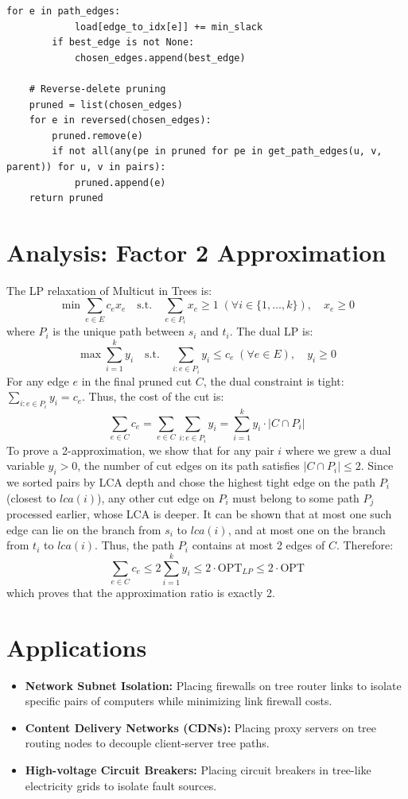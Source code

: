 \begin{lstlisting}[style=python, caption=Primal-Dual Multicut in Trees]
        for e in path_edges:
            load[edge_to_idx[e]] += min_slack
        if best_edge is not None:
            chosen_edges.append(best_edge)
            
    # Reverse-delete pruning
    pruned = list(chosen_edges)
    for e in reversed(chosen_edges):
        pruned.remove(e)
        if not all(any(pe in pruned for pe in get_path_edges(u, v, parent)) for u, v in pairs):
            pruned.append(e)
    return pruned
\end{lstlisting}

\section{Analysis: Factor 2 Approximation}
The LP relaxation of Multicut in Trees is:
\[
\min \sum_{e \in E} c_e x_e \quad \text{s.t.} \quad \sum_{e \in P_i} x_e \ge 1 \; (\forall i \in \{1, \dots, k\}), \quad x_e \ge 0
\]
where $P_i$ is the unique path between $s_i$ and $t_i$. The dual LP is:
\[
\max \sum_{i=1}^k y_i \quad \text{s.t.} \quad \sum_{i: e \in P_i} y_i \le c_e \; (\forall e \in E), \quad y_i \ge 0
\]
For any edge $e$ in the final pruned cut $C$, the dual constraint is tight: $\sum_{i: e \in P_i} y_i = c_e$. Thus, the cost of the cut is:
\[
\sum_{e \in C} c_e = \sum_{e \in C} \sum_{i: e \in P_i} y_i = \sum_{i=1}^k y_i \cdot |C \cap P_i|
\]
To prove a 2-approximation, we show that for any pair $i$ where we grew a dual variable $y_i > 0$, the number of cut edges on its path satisfies $|C \cap P_i| \le 2$.
Since we sorted pairs by LCA depth and chose the highest tight edge on the path $P_i$ (closest to $lca(i)$), any other cut edge on $P_i$ must belong to some path $P_j$ processed earlier, whose LCA is deeper. It can be shown that at most one such edge can lie on the branch from $s_i$ to $lca(i)$, and at most one on the branch from $t_i$ to $lca(i)$. Thus, the path $P_i$ contains at most 2 edges of $C$. Therefore:
\[
\sum_{e \in C} c_e \le 2 \sum_{i=1}^k y_i \le 2 \cdot \text{OPT}_{LP} \le 2 \cdot \text{OPT}
\]
which proves that the approximation ratio is exactly 2.

\section{Applications}
\begin{itemize}
    \item \textbf{Network Subnet Isolation:} Placing firewalls on tree router links to isolate specific pairs of computers while minimizing link firewall costs.
    \item \textbf{Content Delivery Networks (CDNs):} Placing proxy servers on tree routing nodes to decouple client-server tree paths.
    \item \textbf{High-voltage Circuit Breakers:} Placing circuit breakers in tree-like electricity grids to isolate fault sources.
\end{itemize}

